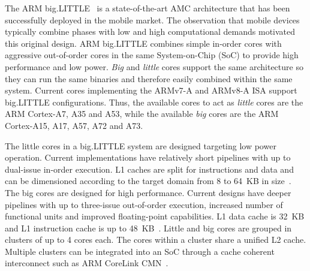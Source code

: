 
The ARM big.LITTLE~\cite{samsung, Greenhalgh2011} is a state-of-the-art AMC architecture that has been successfully deployed in the mobile market. The observation that mobile devices typically combine phases with low and high computational demands motivated this original design. ARM big.LITTLE combines simple in-order cores with aggressive out-of-order cores in the same System-on-Chip (SoC) to provide high performance and low power. \textit{Big} and \textit{little} cores support the same architecture so they can run the same binaries and therefore easily combined within the same system.
% 
Current cores implementing the ARMv7-A and ARMv8-A ISA support 
big.LIT\-TLE configurations. Thus, the available cores to act as \textit{little} cores are the ARM 
Cortex-A7, A35 and A53, while the available \textit{big} cores are the ARM Cortex-A15, A17, A57, A72 and A73.

The little cores in a big.LITTLE system are designed targeting low power operation. Current implementations have relatively short pipelines with up to dual-issue in-order execution. L1 caches are split for instructions and data and can be dimensioned according to the target domain from 8 to 64~KB in size~\cite{MPR_A53}. The big cores are designed for high performance. Current designs have deeper pipelines with up to three-issue out-of-order execution, increased number of functional units and improved floating-point capabilities. L1 data cache is 32~KB and L1 instruction cache is up to 48~KB~\cite{MPR_A57, MPR_A72}. Little and big cores are grouped in clusters of up to 4 cores each. The cores within a cluster share a unified L2 cache. Multiple clusters can be integrated into an SoC through a cache coherent interconnect such as ARM CoreLink CMN~\cite{CoreLink}.

